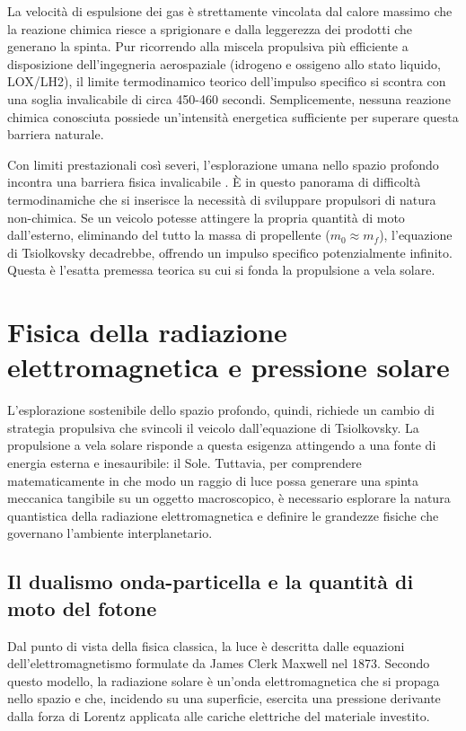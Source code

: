 La velocità di espulsione dei gas è strettamente vincolata dal calore massimo che la reazione chimica riesce a sprigionare e dalla leggerezza dei prodotti che generano la spinta. Pur ricorrendo alla miscela propulsiva più efficiente a disposizione dell'ingegneria aerospaziale (idrogeno e ossigeno allo stato liquido, LOX/LH2), il limite termodinamico teorico dell'impulso specifico si scontra con una soglia invalicabile di circa 450-460 secondi. Semplicemente, nessuna reazione chimica conosciuta possiede un'intensità energetica sufficiente per superare questa barriera naturale.

Con limiti prestazionali così severi, l'esplorazione umana nello spazio profondo incontra una barriera fisica invalicabile \cite{mcconnell2023solarcruiser, montgomery2017roadmap}. È in questo panorama di difficoltà termodinamiche che si inserisce la necessità di sviluppare propulsori di natura non-chimica. 
Se un veicolo potesse attingere la propria quantità di moto dall'esterno, eliminando del tutto la massa di propellente ($m_0 \approx m_f$), l'equazione di Tsiolkovsky decadrebbe, offrendo un impulso specifico potenzialmente infinito. Questa è l'esatta premessa teorica su cui si fonda la propulsione a vela solare.


\section{Fisica della radiazione elettromagnetica e pressione solare}
L'esplorazione sostenibile dello spazio profondo, quindi, richiede un cambio di strategia propulsiva che svincoli il veicolo dall'equazione di Tsiolkovsky. La propulsione a vela solare risponde a questa esigenza attingendo a una fonte di energia esterna e inesauribile: il Sole. Tuttavia, per comprendere matematicamente in che modo un raggio di luce possa generare una spinta meccanica tangibile su un oggetto macroscopico, è necessario esplorare la natura quantistica della radiazione elettromagnetica e definire le grandezze fisiche che governano l'ambiente interplanetario.


\subsection{Il dualismo onda-particella e la quantità di moto del fotone}
Dal punto di vista della fisica classica, la luce è descritta dalle equazioni dell'elettromagnetismo formulate da James Clerk Maxwell nel 1873. Secondo questo modello, la radiazione solare è un'onda elettromagnetica che si propaga nello spazio e che, incidendo su una superficie, esercita una pressione derivante dalla forza di Lorentz applicata alle cariche elettriche del materiale investito.

